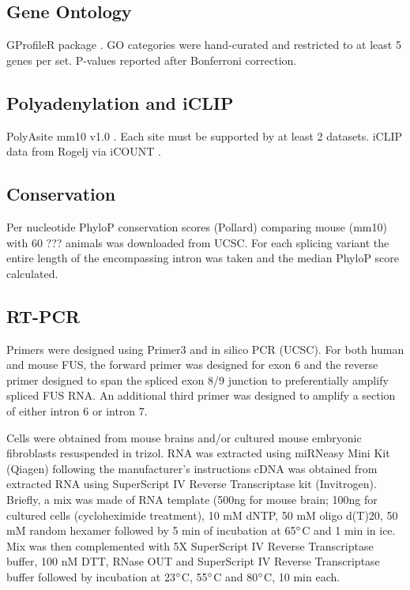 \subsection{Gene Ontology}
GProfileR package \citep{Reimand2016}. GO categories were hand-curated and restricted to at least 5 genes per set. P-values reported after Bonferroni correction. 

\subsection{Polyadenylation and iCLIP}
PolyAsite mm10 v1.0 \citep{Gruber2016} . Each site must be supported by at least 2 datasets.
iCLIP data from Rogelj via iCOUNT .

\subsection{Conservation}
Per nucleotide PhyloP conservation scores (Pollard) \citep{Pollard2010-fj} comparing mouse (mm10) with 60 ??? animals was downloaded from UCSC. For each splicing variant the entire length of the encompassing intron was taken and the median PhyloP score calculated.

\subsection{RT-PCR}
Primers were designed using Primer3 \citep{Koressaar2007} and in silico PCR (UCSC). 
For both human and mouse FUS, the forward primer was designed for exon 6 and the reverse primer designed to span the spliced exon 8/9 junction to preferentially amplify spliced FUS RNA. 
An additional third primer was designed to amplify a section of either intron 6 or intron 7.

Cells were obtained from mouse brains and/or cultured mouse embryonic fibroblasts resuspended in trizol. 
RNA was extracted using miRNeasy Mini Kit (Qiagen) following the manufacturer’s instructions %
cDNA was obtained from extracted RNA using SuperScript IV Reverse Transcriptase kit (Invitrogen). 
Briefly, a mix was made of RNA template (500ng for mouse brain; 100ng for cultured cells (cycloheximide treatment), 10 mM dNTP, 50 mM oligo d(T)20, 50 mM random hexamer followed by 5 min of incubation at 65$\degree$C and 1 min in ice. Mix was then complemented with 5X SuperScript IV Reverse Transcriptase buffer, 100 nM DTT, RNase OUT and SuperScript IV Reverse Transcriptase buffer followed by incubation at 23$\degree$C, 55$\degree$C and 80$\degree$C, 10 min each. 

